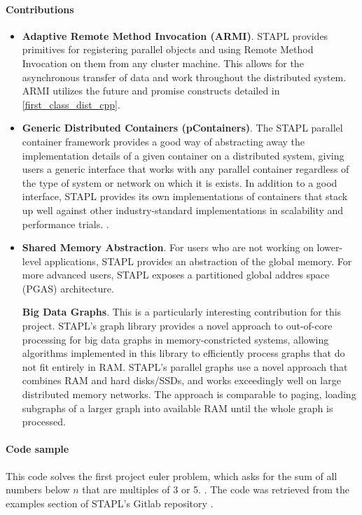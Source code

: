 {\paragraph{Contributions} 
\begin{itemize}
	\item
		\textbf{Adaptive Remote Method Invocation (ARMI)}. STAPL provides primitives for registering parallel objects and using Remote Method Invocation on them from any cluster machine. This allows for the asynchronous transfer of data and work throughout the distributed system.  ARMI utilizes the future and promise constructs detailed in \ref{first_class_dist_cpp}. 
	\item
		\textbf{Generic Distributed Containers (pContainers)}. The STAPL parallel container framework provides a good way of abstracting away the implementation details of a given container on a distributed system, giving users a generic interface that works with any parallel container regardless of the type of system or network on which it is exists. In addition to a good interface, STAPL provides its own implementations of containers that stack up well against other industry-standard implementations in scalability and performance trials. \cite{stapl_parallel_container}.	
	\item
		\textbf{Shared Memory Abstraction}. For users who are not working on lower-level applications, STAPL provides an abstraction of the global memory. For more advanced users, STAPL exposes a partitioned global addres space (PGAS) architecture. 

		\textbf{Big Data Graphs}. This is a particularly interesting contribution for this project. STAPL's graph library \cite{stapl_graph} provides a novel approach to out-of-core processing for big data graphs in memory-constricted systems, allowing algorithms implemented in this library to efficiently process graphs that do not fit entirely in RAM. STAPL's parallel graphs use a novel approach that combines RAM and hard disks/SSDs, and works exceedingly well on large distributed memory networks. The approach is comparable to paging, loading subgraphs of a larger graph into available RAM until the whole graph is processed. 
\end{itemize}

\paragraph{Code sample}
This code solves the first project euler problem, which asks for the sum of all numbers below $n$ that are multiples of 3 or 5. \cite{euler_1}. The code was retrieved from the examples section of STAPL's Gitlab repository \cite{stapl_gitlab}.  
\scriptsize
\begin{lstlisting}[language=C++, caption=STAPL code sample for Project Euler number 1. Headers and doxygen comments removed for brevity, captionpos=b]


\end{lstlisting}}
